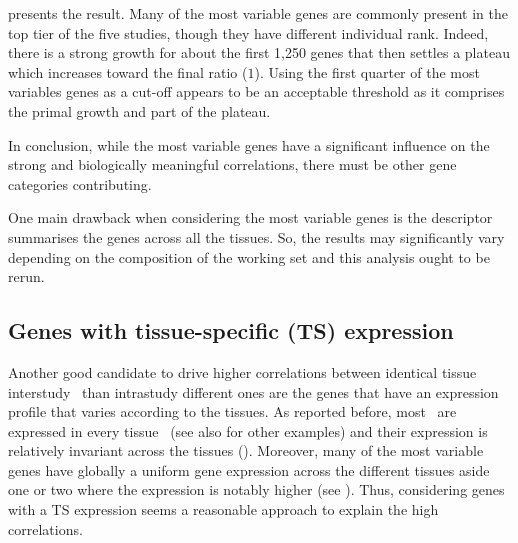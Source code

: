  presents the result.
Many of the most variable genes are commonly present in the top tier of the
five studies, though they have different individual rank.
Indeed, there is a strong growth for about the first 1,250 genes that then
settles a plateau which increases toward the final ratio ($1$).
Using the first quarter of the most variables genes as a cut-off appears
to be an acceptable threshold
as it comprises the primal growth and part of the plateau.

\begin{comment}
If the previous analysis was to include
only the first 1,250 most variable genes
the results of \Cref{fig:heatmapMost25pVariable} may be even greater.
However, the dissimilarities highlighted by \Cref{fig:ReverseheatmapMost25pVariable}
would also be greater.
\end{comment}

In conclusion, while the most variable genes have a significant influence
on the strong and biologically meaningful correlations,
there must be other gene categories contributing.

\begin{comment}
The most variable genes present overall a distinct expression pattern
where one tissue stands out with a much higher expression.
Moreover, these patterns are mostly consistent across the independent studies
(see \Cref{fig:expressionMostvariableG}).
\end{comment}

One main drawback when considering the most variable genes is
the descriptor summarises the genes across all the tissues.
So,
the results may significantly vary
depending on the composition of the working set
and this analysis ought to be rerun.

\subsection{Genes with tissue-specific (TS) expression}\label{sub:TisSpeGene}

Another good candidate to drive higher correlations
between identical tissue interstudy \treps\ than intrastudy different ones
are the genes that have an expression profile
that varies according to the tissues.
As reported before,
most \mRNAs\ are expressed in every tissue~
(see also  for other examples) and
their expression is relatively invariant across the tissues ().
Moreover,
many of the most variable genes
have globally a uniform gene expression across the different tissues
aside one or two where the expression is notably higher
(see ).
Thus,
considering genes with a \gls{TS} expression
seems a reasonable approach to explain the high correlations.

